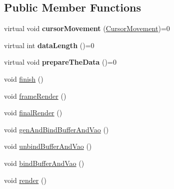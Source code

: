 \subsection*{Public Member Functions}
\begin{DoxyCompactItemize}
\item 
\hypertarget{classShape_a0961d7281bca29285d6612b75bb157d9}{}virtual void {\bfseries cursor\+Movement} (\hyperlink{classCursorMovement}{Cursor\+Movement})=0\label{classShape_a0961d7281bca29285d6612b75bb157d9}

\item 
\hypertarget{classShape_a32cbd03b3856b47df4130bfe8146845b}{}virtual int {\bfseries data\+Length} ()=0\label{classShape_a32cbd03b3856b47df4130bfe8146845b}

\item 
\hypertarget{classShape_a0a6013295cf3ca8f46616071fd758343}{}virtual void {\bfseries prepare\+The\+Data} ()=0\label{classShape_a0a6013295cf3ca8f46616071fd758343}

\item 
void \hyperlink{classShape_a3651abfa2b1d449f35c83b3dc64f64f2}{finish} ()
\item 
void \hyperlink{classShape_a54656be292bf729d6ea90b06f5c7960e}{frame\+Render} ()
\item 
void \hyperlink{classShape_a00ca157cc139d7ba9259ba3e2967c908}{final\+Render} ()
\item 
void \hyperlink{classShape_a4802e77733cb6d47f7eb69fcb4fdf089}{gen\+And\+Bind\+Buffer\+And\+Vao} ()
\item 
void \hyperlink{classShape_a3a78a69fcfd3a2bc9f80ad5a00fdf669}{unbind\+Buffer\+And\+Vao} ()
\item 
void \hyperlink{classShape_aff33547fafee1a528cdee387c0fb54aa}{bind\+Buffer\+And\+Vao} ()
\item 
void \hyperlink{classShape_ad62ee6dbad795d967e2f572f6e4e27fb}{render} ()
\end{DoxyCompactItemize}
